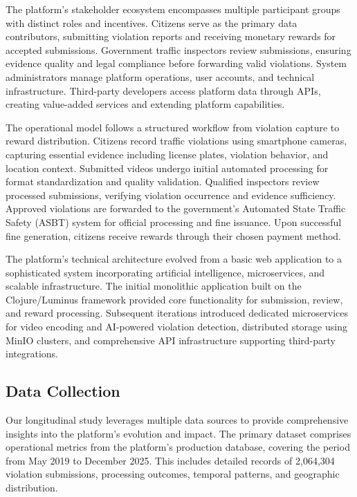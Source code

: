 \documentclass[pdflatex,sn-mathphys-num]{sn-jnl}%
\theoremstyle{thmstyleone}%
\theoremstyle{thmstyletwo}%
\theoremstyle{thmstylethree}%
\begin{document}
The platform's stakeholder ecosystem encompasses multiple participant groups with distinct roles and incentives. Citizens serve as the primary data contributors, submitting violation reports and receiving monetary rewards for accepted submissions. Government traffic inspectors review submissions, ensuring evidence quality and legal compliance before forwarding valid violations. System administrators manage platform operations, user accounts, and technical infrastructure. Third-party developers access platform data through APIs, creating value-added services and extending platform capabilities.

The operational model follows a structured workflow from violation capture to reward distribution. Citizens record traffic violations using smartphone cameras, capturing essential evidence including license plates, violation behavior, and location context. Submitted videos undergo initial automated processing for format standardization and quality validation. Qualified inspectors review processed submissions, verifying violation occurrence and evidence sufficiency. Approved violations are forwarded to the government's Automated State Traffic Safety (ASBT) system for official processing and fine issuance. Upon successful fine generation, citizens receive rewards through their chosen payment method.

The platform's technical architecture evolved from a basic web application to a sophisticated system incorporating artificial intelligence, microservices, and scalable infrastructure. The initial monolithic application built on the Clojure/Luminus framework provided core functionality for submission, review, and reward processing. Subsequent iterations introduced dedicated microservices for video encoding and AI-powered violation detection, distributed storage using MinIO clusters, and comprehensive API infrastructure supporting third-party integrations.

\subsection{Data Collection}\label{subsec10}

Our longitudinal study leverages multiple data sources to provide comprehensive insights into the platform's evolution and impact. The primary dataset comprises operational metrics from the platform's production database, covering the period from May 2019 to December 2025. This includes detailed records of 2,064,304 violation submissions, processing outcomes, temporal patterns, and geographic distribution.
\end{document}
